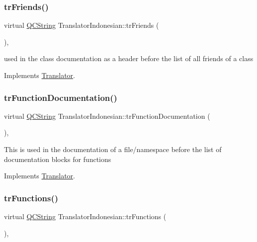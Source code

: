 \subsubsection{\texorpdfstring{trFriends()}{trFriends()}}
{\footnotesize\ttfamily virtual \mbox{\hyperlink{class_q_c_string}{Q\+C\+String}} Translator\+Indonesian\+::tr\+Friends (\begin{DoxyParamCaption}{ }\end{DoxyParamCaption})\hspace{0.3cm}{\ttfamily [inline]}, {\ttfamily [virtual]}}

used in the class documentation as a header before the list of all friends of a class 

Implements \mbox{\hyperlink{class_translator}{Translator}}.

\mbox{\label{class_translator_indonesian_ae6bad3785ce3a98f68ff0821602ae2b9}} 
\subsubsection{\texorpdfstring{trFunctionDocumentation()}{trFunctionDocumentation()}}
{\footnotesize\ttfamily virtual \mbox{\hyperlink{class_q_c_string}{Q\+C\+String}} Translator\+Indonesian\+::tr\+Function\+Documentation (\begin{DoxyParamCaption}{ }\end{DoxyParamCaption})\hspace{0.3cm}{\ttfamily [inline]}, {\ttfamily [virtual]}}

This is used in the documentation of a file/namespace before the list of documentation blocks for functions 

Implements \mbox{\hyperlink{class_translator}{Translator}}.

\mbox{\label{class_translator_indonesian_a34424a055dbe0a36adaa51c6c33b8432}} 
\subsubsection{\texorpdfstring{trFunctions()}{trFunctions()}}
{\footnotesize\ttfamily virtual \mbox{\hyperlink{class_q_c_string}{Q\+C\+String}} Translator\+Indonesian\+::tr\+Functions (\begin{DoxyParamCaption}{ }\end{DoxyParamCaption})\hspace{0.3cm}{\ttfamily [inline]}, {\ttfamily [virtual]}}

